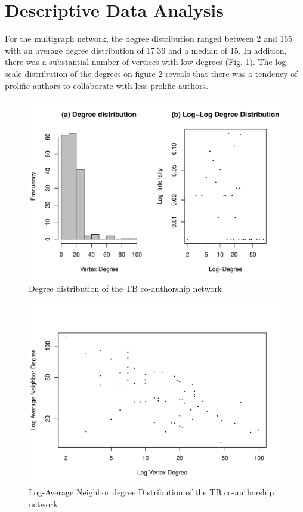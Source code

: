 \section{Descriptive Data Analysis}
\label{sec:tb_descstat}
For the multigraph network, the degree distribution ranged between 2 and 165 with an average degree distribution of 17.36 and a median of 15. In addition, there was a substantial number of vertices with low degrees (Fig. \ref{tb_fig1}). The log scale distribution of the degrees on figure \ref{tb_fig2} reveals that there was a tendency of prolific authors to collaborate with less prolific authors. 

\begin{figure}[h!]
\centering
\includegraphics[scale=0.65]{Chapters/tb/degreeDistribution}
\caption{Degree distribution of the TB co-authorship network}
\label{tb_fig1}
\end{figure}

\begin{figure}[h!]
\centering
\includegraphics[scale=0.65]{Chapters/tb/logAvgDegree}
\caption{Log-Average Neighbor degree Distribution of the TB co-authorship network}
\label{tb_fig2}
\end{figure}

